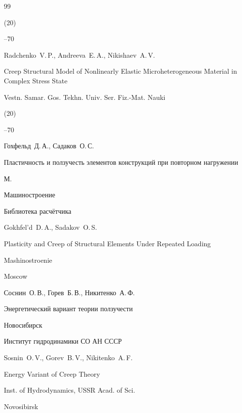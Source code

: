 \begin{thebibliography}{99}

(20)

--70


\misctransl

\by Radchenko~V.\,P., Andreeva~E.\,A., Nikishaev~A.\,V.

\paper Creep Structural Model of Nonlinearly Elastic Microheterogeneous Material in Complex Stress State

\jour Vestn. Samar. Gos. Tekhn. Univ. Ser. Fiz.-Mat. Nauki


(20)

--70




\by Гохфельд~Д.\,А., Садаков~О.\,С.

\book Пластичность и ползучесть элементов конструкций при повторном нагружении

\publaddr М.

\publ Машиностроение

\serial Библиотека расчётчика



\misctransl

\by Gokhfel'd~D.\,A., Sadakov~O.\,S.

\book Plasticity and Creep of Structural Elements Under Repeated Loading 

\publ Mashinostroenie

\publaddr Moscow






\by Соснин~О.\,В., Горев~Б.\,В., Никитенко~А.\,Ф.

\book Энергетический вариант теории ползучести

\publaddr Новосибирск

\publ Институт гидродинамики СО АН СССР



\misctransl

\by Sosnin~O.\,V., Gorev~B.\,V., Nikitenko~A.\,F.

\book Energy Variant of Creep Theory 

\publ Inst. of Hydrodynamics, USSR Acad. of Sci.



\publaddr Novosibirsk



\end{thebibliography}



